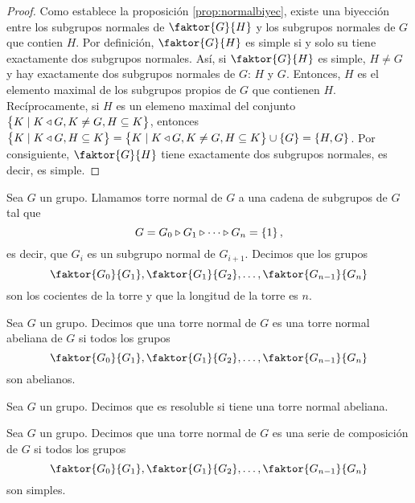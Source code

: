 \begin{proof}
    Como establece la proposición \ref{prop:normalbiyec}, existe una biyección entre los subgrupos normales de $\faktor{G}{H}$ y los subgrupos normales de $G$ que contien $H$. Por definición, $\faktor{G}{H}$ es simple si y solo su tiene exactamente dos subgrupos normales. Así, si $\faktor{G}{H}$ es simple, $H\neq G$ y hay exactamente dos subgrupos normales de $G$: $H$ y $G$. Entonces, $H$ es el elemento maximal de los subgrupos propios de $G$ que contienen $H$. Recíprocamente, si $H$ es un elemeno maximal del conjunto $\left\{ K\mid K\triangleleft G, K\neq G, H\subseteq K\right\}$, entonces $\left\{ K\mid K\triangleleft G, H\subseteq K\right\} = \left\{ K\mid K\triangleleft G, K\neq G, H\subseteq K\right\} \cup \left\{ G\right\}=\left\{ H, G\right\}$. Por consiguiente, $\faktor{G}{H}$ tiene exactamente dos subgrupos normales, es decir, es simple.
\end{proof}
\begin{defi}
    Sea $G$ un grupo. Llamamos torre normal de $G$ a una cadena de subgrupos de $G$ tal que
    \[
        G=G_0\triangleright G_1\triangleright\cdots\triangleright G_n=\left\{ 1\right\},
    \]
    es decir, que $G_i$ es un subgrupo normal de $G_{i+1}$. Decimos que los grupos
    \[
        \faktor{G_0}{G_1}, \faktor{G_1}{G_2}, \dots, \faktor{G_{n-1}}{G_n}
    \]
    son los cocientes de la torre y que la longitud de la torre es $n$.
\end{defi}
\begin{defi}
    Sea $G$ un grupo. Decimos que una torre normal de $G$ es una torre normal abeliana de $G$ si todos los grupos
    \[
        \faktor{G_0}{G_1}, \faktor{G_1}{G_2}, \dots, \faktor{G_{n-1}}{G_n}
    \]
    son abelianos.
\end{defi}
\begin{defi}
    Sea $G$ un grupo. Decimos que es resoluble si tiene una torre normal abeliana.
\end{defi}
\begin{defi}
    Sea $G$ un grupo. Decimos que una torre normal de $G$ es una serie de composición de $G$ si todos los grupos
    \[
        \faktor{G_0}{G_1}, \faktor{G_1}{G_2}, \dots, \faktor{G_{n-1}}{G_n}
    \]
    son simples.
\end{defi}
